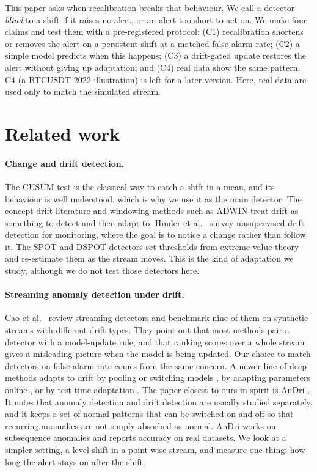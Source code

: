 \documentclass[11pt]{article}
\begin{document}
This paper asks when recalibration breaks that behaviour. We call a detector \emph{blind} to a shift if it raises no alert, or an alert too short to act on. We make four claims and test them with a pre-registered protocol: (C1) recalibration shortens or removes the alert on a persistent shift at a matched false-alarm rate; (C2) a simple model predicts when this happens; (C3) a drift-gated update restores the alert without giving up adaptation; and (C4) real data show the same pattern. C4 (a BTCUSDT 2022 illustration) is left for a later version. Here, real data are used only to match the simulated stream.

\section{Related work}

\paragraph{Change and drift detection.} The CUSUM test \cite{page1954,hawkins1998} is the classical way to catch a shift in a mean, and its behaviour is well understood, which is why we use it as the main detector. The concept drift literature \cite{gama2014survey,lu2019review} and windowing methods such as ADWIN \cite{bifet2007adwin} treat drift as something to detect and then adapt to. Hinder et al.\ \cite{hinder2024} survey unsupervised drift detection for monitoring, where the goal is to notice a change rather than follow it. The SPOT and DSPOT detectors \cite{siffer2017spot} set thresholds from extreme value theory and re-estimate them as the stream moves. This is the kind of adaptation we study, although we do not test those detectors here.

\paragraph{Streaming anomaly detection under drift.} Cao et al.\ \cite{cao2025} review streaming detectors and benchmark nine of them on synthetic streams with different drift types. They point out that most methods pair a detector with a model-update rule, and that ranking scores over a whole stream gives a misleading picture when the model is being updated. Our choice to match detectors on false-alarm rate comes from the same concern. A newer line of deep methods adapts to drift by pooling or switching models \cite{yoon2022arcus}, by adapting parameters online \cite{zhu2023meter}, or by test-time adaptation \cite{kim2026candi}. The paper closest to ours in spirit is AnDri \cite{park2025andri}. It notes that anomaly detection and drift detection are usually studied separately, and it keeps a set of normal patterns that can be switched on and off so that recurring anomalies are not simply absorbed as normal. AnDri works on subsequence anomalies and reports accuracy on real datasets. We look at a simpler setting, a level shift in a point-wise stream, and measure one thing: how long the alert stays on after the shift.
\end{document}
